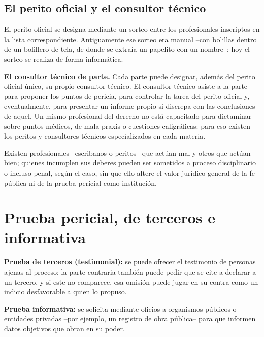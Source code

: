 \documentclass[12pt,oneside]{book}
\begin{document}
\subsection*{El perito oficial y el consultor técnico}

El perito oficial se designa mediante un sorteo entre los profesionales inscriptos en la lista correspondiente. Antiguamente ese sorteo era manual --con bolillas dentro de un bolillero de tela, de donde se extraía un papelito con un nombre--; hoy el sorteo se realiza de forma informática.

\begin{important}
\textbf{El consultor técnico de parte.} Cada parte puede designar, además del perito oficial único, su propio consultor técnico. El consultor técnico asiste a la parte para proponer los puntos de pericia, para controlar la tarea del perito oficial y, eventualmente, para presentar un informe propio si discrepa con las conclusiones de aquel. Un mismo profesional del derecho no está capacitado para dictaminar sobre puntos médicos, de mala praxis o cuestiones caligráficas: para eso existen los peritos y consultores técnicos especializados en cada materia.
\end{important}

\begin{note}
Existen profesionales --escribanos o peritos-- que actúan mal y otros que actúan bien; quienes incumplen sus deberes pueden ser sometidos a proceso disciplinario o incluso penal, según el caso, sin que ello altere el valor jurídico general de la fe pública ni de la prueba pericial como institución.
\end{note}

\section{Prueba pericial, de terceros e informativa}

\begin{important}
\textbf{Prueba de terceros (testimonial):} se puede ofrecer el testimonio de personas ajenas al proceso; la parte contraria también puede pedir que se cite a declarar a un tercero, y si este no comparece, esa omisión puede jugar en su contra como un indicio desfavorable a quien lo propuso.

\textbf{Prueba informativa:} se solicita mediante oficios a organismos públicos o entidades privadas --por ejemplo, un registro de obra pública-- para que informen datos objetivos que obran en su poder.
\end{important}
\end{document}
